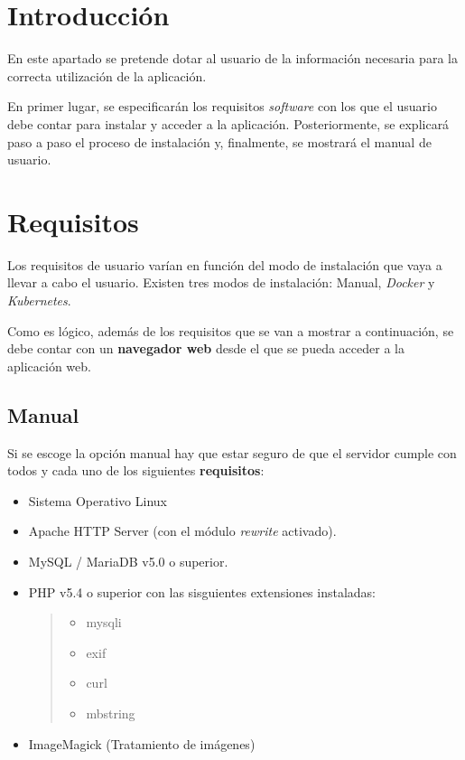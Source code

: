
\section{Introducción}

En este apartado se pretende dotar al usuario de la información
necesaria para la correcta utilización de la aplicación. 

En primer lugar, se especificarán los requisitos \emph{software} con los que el
usuario debe contar para instalar y acceder a la aplicación. Posteriormente, se
explicará paso a paso el proceso de instalación y, finalmente, se
mostrará el manual de usuario.


\section{Requisitos}
Los requisitos de usuario varían en función del modo de instalación que
vaya a llevar a cabo el usuario. Existen tres modos de instalación:
Manual, \emph{Docker} y \emph{Kubernetes}.

Como es lógico, además de los requisitos que se van a mostrar a
continuación, se debe contar con un \textbf{navegador web} desde el que
se pueda acceder a la aplicación web.


\subsection{Manual}

Si se escoge la opción manual hay que estar seguro de que el servidor
cumple con todos y cada uno de los siguientes \textbf{requisitos}:

\begin{itemize}
\tightlist
\item
  Sistema Operativo Linux \cite{linux:web}
\item
  Apache HTTP Server \cite{apache:install} (con el módulo \emph{rewrite} activado).
\item
  MySQL / MariaDB v5.0 \cite{mysql:install} o superior.
\item
  PHP v5.4 \cite{php:install} o superior con las sisguientes extensiones instaladas:

  \begin{quote}
  \begin{itemize}
  \tightlist
  \item
    mysqli
  \item
    exif
  \item
    curl
  \item
    mbstring
  \end{itemize}
  \end{quote}
\item
  ImageMagick \cite{imagemagick:install} (Tratamiento de imágenes)
\end{itemize}

